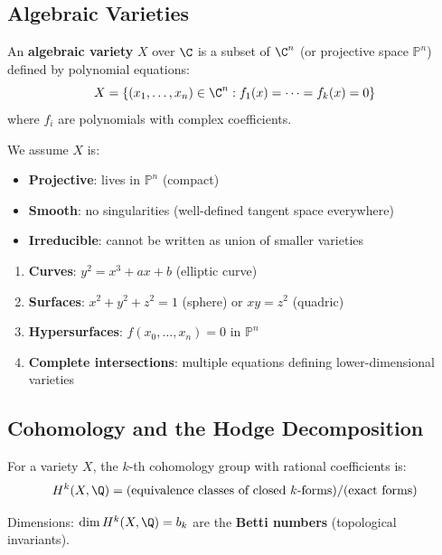 \subsection{Algebraic Varieties}

\begin{defn}\label{def:algebraic-variety}
An \textbf{algebraic variety} $X$ over $\C$ is a subset of $\C^n$ (or projective space $\mathbb{P}^n$) defined by polynomial equations:
\begin{equation}
X = \{(x_1, \ldots, x_n) \in \C^n : f_1(x) = \cdots = f_k(x) = 0\}
\end{equation}
where $f_i$ are polynomials with complex coefficients.

We assume $X$ is:
\begin{itemize}
\item \textbf{Projective}: lives in $\mathbb{P}^n$ (compact)
\item \textbf{Smooth}: no singularities (well-defined tangent space everywhere)
\item \textbf{Irreducible}: cannot be written as union of smaller varieties
\end{itemize}
\end{defn}

\begin{example}
\begin{enumerate}
\item \textbf{Curves}: $y^2 = x^3 + ax + b$ (elliptic curve)
\item \textbf{Surfaces}: $x^2 + y^2 + z^2 = 1$ (sphere) or $xy = z^2$ (quadric)
\item \textbf{Hypersurfaces}: $f(x_0, \ldots, x_n) = 0$ in $\mathbb{P}^n$
\item \textbf{Complete intersections}: multiple equations defining lower-dimensional varieties
\end{enumerate}
\end{example}

\subsection{Cohomology and the Hodge Decomposition}

\begin{defn}\label{def:singular-cohomology}
For a variety $X$, the $k$-th cohomology group with rational coefficients is:
\begin{equation}
H^k(X, \Q) = \text{(equivalence classes of closed } k\text{-forms)} / \text{(exact forms)}
\end{equation}

Dimensions: $\dim H^k(X, \Q) = b_k$ are the \textbf{Betti numbers} (topological invariants).
\end{defn}


